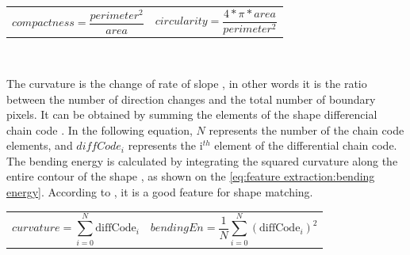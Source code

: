 \noindent\begin{tabularx}{\textwidth}{@{}XX@{}}
	\begin{equation} \label{eq:feature extraction:compactness}
		compactness = \frac{perimeter^2}{area}
	\end{equation} & 
	\begin{equation} \label{eq:feature extraction:circularity}
		circularity = \frac{4 * \pi * area}{perimeter^2}
	\end{equation}
\end{tabularx}

~~ 

The curvature is the change of rate of slope \cite{bib:chain:ObjectDescription}, in other words it is the ratio between the number of direction changes and the total number of boundary pixels. It can be obtained by summing the elements of the shape differencial chain code  \cite{bib:chain:ShapeRepresentationDescription}. In the following equation, $N$ represents the number of the chain code elements, and $diffCode_i$ represents the i$^{th}$ element of the differential chain code. The bending energy is calculated by integrating the squared curvature along the entire contour of the shape \cite{bib:chain:ShapeRepresentationDescription}, as shown on the \vref{eq:feature extraction:bending energy}. According to \cite{bib:chain:ShapeDescriptionLesson}, it is a good feature for shape matching. 

\noindent\begin{tabularx}{\textwidth}{@{}XX@{}}
	\begin{equation}
		curvature = \sum_{i = 0}^{N} \text{diffCode}_i
	\end{equation} & 
	\begin{equation} \label{eq:feature extraction:bending energy}
		bendingEn = \frac{1}{N} \sum_{i = 0}^{N} (\text{diffCode}_i)^{2}
	\end{equation}
\end{tabularx}






